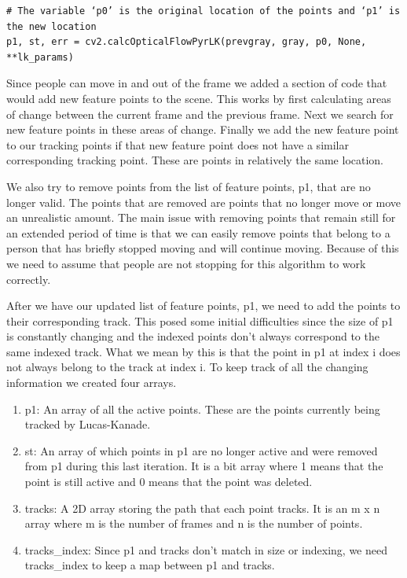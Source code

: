 \documentclass[conference]{IEEEtran}
\begin{document}
\begin{lstlisting}
# The variable ‘p0’ is the original location of the points and ‘p1’ is the new location
p1, st, err = cv2.calcOpticalFlowPyrLK(prevgray, gray, p0, None, **lk_params)
\end{lstlisting}

Since people can move in and out of the frame we added a section of code that would add new feature points to the scene. This works by first calculating areas of change between the current frame and the previous frame. Next we search for new feature points in these areas of change. Finally we add the new feature point to our tracking points if that new feature point does not have a similar corresponding tracking point. These are points in relatively the same location.

We also try to remove points from the list of feature points, p1, that are no longer valid. The points that are removed are points that no longer move or move an unrealistic amount. The main issue with removing points that remain still for an extended period of time is that we can easily remove points that belong to a person that has briefly stopped moving and will continue moving. Because of this we need to assume that people are not stopping for this algorithm to work correctly.

After we have our updated list of feature points, p1, we need to add the points to their corresponding track. This posed some initial difficulties since the size of p1 is constantly changing and the indexed points don’t always correspond to the same indexed track. What we mean by this is that the point in p1 at index i does not always belong to the track at index i. To keep track of all the changing information we created four arrays.

\begin{enumerate}
\item p1: An array of all the active points. These are the points currently being tracked by Lucas-Kanade.
\item st: An array of which points in p1 are no longer active and were removed from p1 during this last iteration. It is a bit array where 1 means that the point is still active and 0 means that the point was deleted.
\item tracks: A 2D array storing the path that each point tracks. It is an m x n array where m is the number of frames and n is the number of points.
\item tracks\_index: Since p1 and tracks don’t match in size or indexing, we need tracks\_index to keep a map between p1 and tracks.
\end{enumerate}
\end{document}
